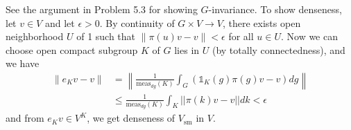 \begin{problem} \notfinish
\end{problem}

\begin{problem} \notfinish
\end{problem}

\begin{problem}
See the argument in Problem 5.3 for showing $G$-invariance.
To show denseness, let $v\in V$ and let $\epsilon > 0$.
By continuity of $G \times V \to V$, there exists open neighborhood $U$ of 1 such 
that $\|\pi(u)v - v\| < \epsilon$ for all $u \in U$.
Now we can choose open compact subgroup $K$ of $G$ lies in $U$ (by totally connectedness),
and we have
\begin{align*}
\|e_{K}v - v\| &= \left\|\frac{1}{\mathrm{meas}_{dg}(K)} \int_{G}(\mathds{1}_{K}(g)\pi(g)v - v)dg\right\| \\
&\leq \frac{1}{\mathrm{meas}_{dg}(K)}\int_K ||\pi(k)v - v||dk <\epsilon
\end{align*}
and from $e_K v \in V^K$, we get denseness of $V_\mathrm{sm}$ in $V$.
\end{problem}

\begin{problem} \notfinish
\end{problem}

\begin{problem} \notfinish
\end{problem}